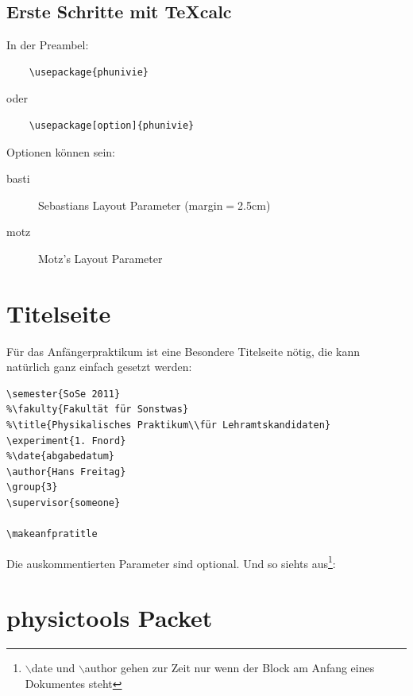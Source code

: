 \documentclass[a4paper]{article}
\newcommand{\texcalc}{{\TeX}calc}
\begin{document}
\subsection{Erste Schritte mit \texcalc}




In der Preambel:

\begin{verbatim}
	\usepackage{phunivie}
\end{verbatim}

oder

\begin{verbatim}
	\usepackage[option]{phunivie}
\end{verbatim}

Optionen können sein: 

\begin{description}
	\item[basti] Sebastians Layout Parameter (margin$=$2.5cm)
	\item[motz] Motz's Layout Parameter
\end{description}
	

\section{Titelseite}

Für das Anfängerpraktikum ist eine Besondere Titelseite nötig, die 
kann natürlich ganz einfach gesetzt werden:

\begin{verbatim}
\semester{SoSe 2011}
%\fakulty{Fakultät für Sonstwas}
%\title{Physikalisches Praktikum\\für Lehramtskandidaten}
\experiment{1. Fnord}
%\date{abgabedatum}
\author{Hans Freitag}
\group{3}
\supervisor{someone}

\makeanfpratitle
\end{verbatim}

Die auskommentierten Parameter sind optional. Und so siehts 
aus\footnote{$\backslash$date und $\backslash$author gehen zur Zeit nur wenn der Block am 
Anfang eines Dokumentes steht}:

\makeanfpratitle


\section{physictools Packet}
\end{document}
